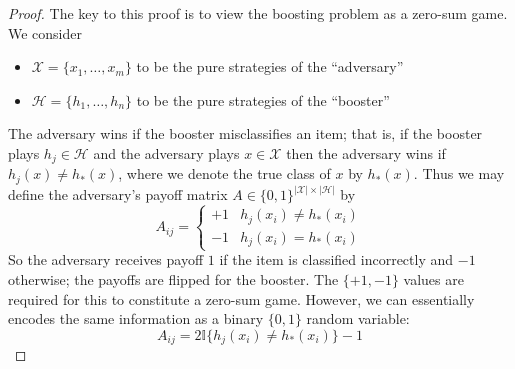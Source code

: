 \documentclass[12pt]{article}
\newcommand*{\abs}[1]{\left\lvert#1\right\rvert}
\begin{document}
\begin{proof}
The key to this proof is to view the boosting problem as a zero-sum game. We consider 
\begin{itemize}
\item $\mathcal{X} = \{x_1, \dots, x_m\}$ to be the pure strategies of the ``adversary'' 
\item $\mathcal{H} = \{h_1, \dots, h_n\}$ to be the pure strategies of the ``booster''
\end{itemize}
The adversary wins if the booster misclassifies an item; that is, if the booster plays $h_j \in \mathcal{H}$ and the adversary plays $x \in \mathcal{X}$ then the adversary 
wins if $h_j(x) \neq h_*(x)$, where we denote the true class of $x$ by $h_*(x)$. Thus we may define the adversary's payoff matrix $A \in \{0, 1\}^{\abs{\mathcal{X}} \times \abs{\mathcal{H}}}$ 
by 
\[A_{ij}  = \begin{cases} 
      +1 & h_j(x_i) \neq h_*(x_i) \\
      -1 & h_j(x_i) = h_*(x_i)
   \end{cases}
\]
So the adversary receives payoff $1$ if the item is classified incorrectly and $-1$ otherwise; the payoffs are flipped for the booster. The $\{+1, -1\}$ values are required for this to constitute a 
zero-sum game. However, we can essentially encodes the same information as a binary $\{0, 1\}$ random variable: 
\[A_{ij} = 2\mathbb{I}\{h_j(x_i) \neq h_*(x_i)\} - 1\] 



\end{proof}
\end{document}
